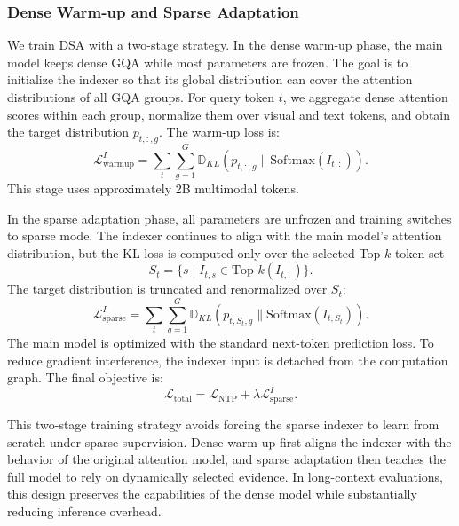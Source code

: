 \documentclass{llmxive}
\begin{document}
\subsubsection{Dense Warm-up and Sparse Adaptation}

We train DSA with a two-stage strategy. In the dense warm-up phase, the main model keeps dense GQA while most parameters are frozen. The goal is to initialize the indexer so that its global distribution can cover the attention distributions of all GQA groups. For query token $t$, we aggregate dense attention scores within each group, normalize them over visual and text tokens, and obtain the target distribution $p_{t,:,g}$. The warm-up loss is:
\begin{equation}
    \mathcal{L}_{\mathrm{warmup}}^{I} =
    \sum_t \sum_{g=1}^{G}
    \mathbb{D}_{KL}(p_{t,:,g} \parallel \mathrm{Softmax}(I_{t,:})).
\end{equation}
This stage uses approximately 2B multimodal tokens.

In the sparse adaptation phase, all parameters are unfrozen and training switches to sparse mode. The indexer continues to align with the main model's attention distribution, but the KL loss is computed only over the selected Top-$k$ token set
\begin{equation}
S_t = \{s \mid I_{t,s} \in \mathrm{Top}\text{-}k(I_{t,:})\}.
\end{equation}
The target distribution is truncated and renormalized over $S_t$:
\begin{equation}
    \mathcal{L}_{\mathrm{sparse}}^{I} =
    \sum_t \sum_{g=1}^{G}
    \mathbb{D}_{KL}(p_{t,S_t,g} \parallel \mathrm{Softmax}(I_{t,S_t})).
\end{equation}
The main model is optimized with the standard next-token prediction loss. To reduce gradient interference, the indexer input is detached from the computation graph. The final objective is:
\begin{equation}
    \mathcal{L}_{\mathrm{total}} =
    \mathcal{L}_{\mathrm{NTP}} + \lambda \mathcal{L}_{\mathrm{sparse}}^{I}.
\end{equation}

This two-stage training strategy avoids forcing the sparse indexer to learn from scratch under sparse supervision. Dense warm-up first aligns the indexer with the behavior of the original attention model, and sparse adaptation then teaches the full model to rely on dynamically selected evidence. In long-context evaluations, this design preserves the capabilities of the dense model while substantially reducing inference overhead.
\end{document}
